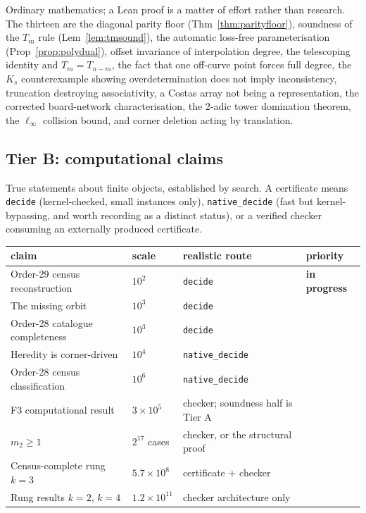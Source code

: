 \documentclass[11pt,a4paper]{article}
\theoremstyle{definition}
\begin{document}
Ordinary mathematics; a Lean proof is a matter of effort rather than research.
The thirteen are the diagonal parity floor (Thm~\ref{thm:parityfloor}), soundness
of the $T_m$ rule (Lem~\ref{lem:tmsound}), the automatic loss-free
parameterisation (Prop~\ref{prop:polydual}), offset invariance of interpolation
degree, the telescoping identity and $T_m=T_{n-m}$, the fact that one off-curve
point forces full degree, the $K_s$ counterexample showing overdetermination does
not imply inconsistency, truncation destroying associativity, a Costas array not
being a representation, the corrected board-network characterisation, the 2-adic
tower domination theorem, the $\ell_\infty$ collision bound, and corner deletion
acting by translation.

\subsection{Tier B: computational claims}

True statements about finite objects, established by search. A certificate means
\texttt{decide} (kernel-checked, small instances only), \texttt{native\_decide}
(fast but kernel-bypassing, and worth recording as a distinct status), or a
verified checker consuming an externally produced certificate.

\begin{center}
\begin{tabular}{@{}llll@{}}
\toprule
claim & scale & realistic route & priority \\
\midrule
Order-29 census reconstruction & $10^2$ & \texttt{decide} & \textbf{in progress} \\
The missing orbit & $10^3$ & \texttt{decide} & \\
Order-28 catalogue completeness & $10^3$ & \texttt{decide} & \\
Heredity is corner-driven & $10^4$ & \texttt{native\_decide} & \\
Order-28 census classification & $10^6$ & \texttt{native\_decide} & \\
F3 computational result & $3\times10^5$ & checker; soundness half is Tier A & \\
$m_2\ge1$ & $2^{17}$ cases & checker, or the structural proof & \\
Census-complete rung $k=3$ & $5.7\times10^8$ & certificate $+$ checker & \\
Rung results $k=2$, $k=4$ & $1.2\times10^{11}$ & checker architecture only & \\
\bottomrule
\end{tabular}
\end{center}
\end{document}
